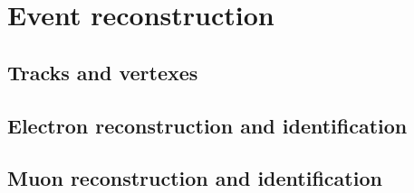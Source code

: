 
\chapter{Event reconstruction}
\section{Tracks and vertexes}
\section{Electron reconstruction and identification}
\section{Muon reconstruction and identification}

